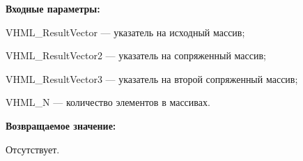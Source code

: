 \textbf{Входные параметры:}
 
VHML\_ResultVector --- указатель на исходный массив;
 
VHML\_ResultVector2 --- указатель на сопряженный массив;
 
VHML\_ResultVector3 --- указатель на второй сопряженный массив;
 
VHML\_N --- количество элементов в массивах.

\textbf{Возвращаемое значение:}

Отсутствует.